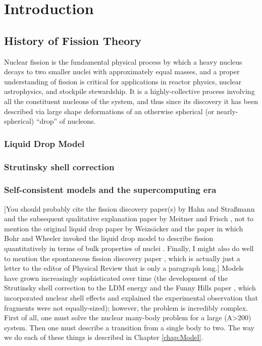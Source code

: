 \chapter{Introduction}\label{chap:Intro}

\section{History of Fission Theory}
Nuclear fission is the fundamental physical process by which a heavy nucleus decays to two smaller nuclei with approximately equal masses, and a proper understanding of fission is critical for applications in reactor physics, nuclear astrophysics, and stockpile stewardship. It is a highly-collective process involving all the constituent nucleons of the system, and thus since its discovery it has been described via large shape deformations of an otherwise spherical (or nearly-spherical) ``drop'' of nucleons. 

\subsection{Liquid Drop Model}
\subsection{Strutinsky shell correction}
\subsection{Self-consistent models and the supercomputing era}
[You should probably cite the fission discovery paper(s) by Hahn and Stra\ss{}mann \cite{Hahn1939} and the subsequent qualitative explanation paper by Meitner and Frisch \cite{Meitner1939}, not to mention the original liquid drop paper by Weizs\"acker \cite{Weizsacker1935} and the paper in which Bohr and Wheeler invoked the liquid drop model to describe fission quantitatively in terms of bulk properties of nuclei \cite{Bohr1939}. Finally, I might also do well to mention the spontaneous fission discovery paper \cite{Flerov1940}, which is actually just a letter to the editor of Physical Review that is only a paragraph long.] Models have grown increasingly sophisticated over time (the development of the Strutinsky shell correction to the LDM energy and the Funny Hills paper \cite{Strutinsky1967,Strutinsky1968,Brack1972}, which incorporated nuclear shell effects and explained the experimental observation that fragments were not equally-sized); however, the problem is incredibly complex. First of all, one must solve the nuclear many-body problem for a large (A>200) system. Then one must describe a transition from a single body to two. The way we do each of these things is described in Chapter \ref{chap:Model}.

